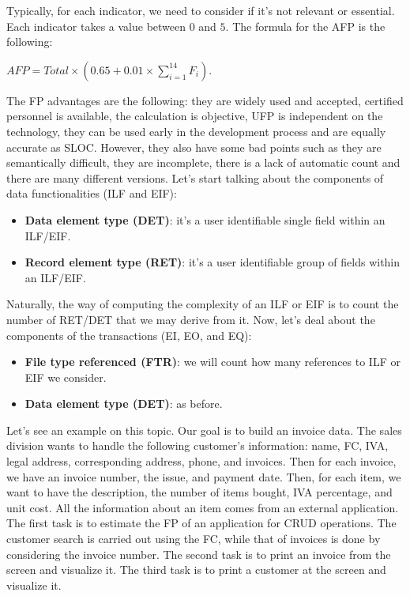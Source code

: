 Typically, for each indicator, we need to consider if it's not relevant or essential.
Each indicator takes a value between $0$ and $5$. The formula for the AFP is the following:
\begin{center}
    $AFP = Total \times (0.65 + 0.01 \times \sum_{i=1}^{14} F_i)$.
\end{center}
The FP advantages are the following: they are widely used and accepted, certified personnel is available, the calculation is objective, UFP is independent on the technology, they can be used early in the development process and are equally accurate as SLOC.
However, they also have some bad points such as they are semantically difficult, they are incomplete, there is a lack of automatic count and there are many different versions.
Let's start talking about the components of data functionalities (ILF and EIF):
\begin{itemize}
    \item \textbf{Data element type (DET)}: it's a user identifiable single field within an ILF/EIF.
    \item \textbf{Record element type (RET)}: it's a user identifiable group of fields within an ILF/EIF.
\end{itemize}
Naturally, the way of computing the complexity of an ILF or EIF is to count the number of RET/DET that we may derive from it. Now, let's deal about the components of the transactions (EI, EO, and EQ):
\begin{itemize}
    \item \textbf{File type referenced (FTR)}: we will count how many references to ILF or EIF we consider.
    \item \textbf{Data element type (DET)}: as before.
\end{itemize}
Let's see an example on this topic.
Our goal is to build an invoice data. The sales division wants to handle the following customer's information: name, FC, IVA, legal address, corresponding address, phone, and invoices.
Then for each invoice, we have an invoice number, the issue, and payment date. Then, for each item, we want to have the description, the number of items bought, IVA percentage, and unit cost.
All the information about an item comes from an external application.
The first task is to estimate the FP of an application for CRUD operations.
The customer search is carried out using the FC, while that of invoices is done by considering the invoice number.
The second task is to print an invoice from the screen and visualize it.
The third task is to print a customer at the screen and visualize it.
